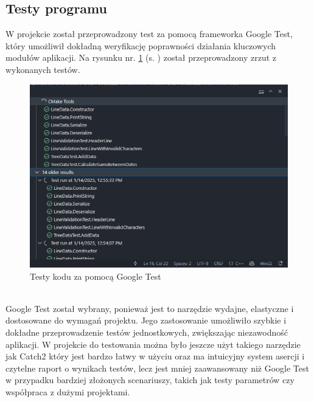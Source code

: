 \subsection{Testy programu}
W projekcie został przeprowadzony test za pomocą frameworka Google Test, który umożliwił dokładną weryfikację poprawności działania kluczowych modułów aplikacji. Na rysunku nr. \ref{rys:rysunek7} (s. \pageref{rys:rysunek7})  został przeprowadzony zrzut z wykonanych testów. 
\\ 
\begin{figure}[h]
    \centering
    \includegraphics[width=0.8\linewidth]{img/test.png}
    \caption{Testy kodu za pomocą Google Test}
    \label{rys:rysunek7}
\end{figure} \\
\noindent Google Test został wybrany, ponieważ jest to narzędzie wydajne, elastyczne i dostosowane do wymagań projektu. Jego zastosowanie umożliwiło szybkie i dokładne przeprowadzenie testów jednostkowych, zwiększając niezawodność aplikacji. W projekcie do testowania można było jeszcze użyt takiego narzędzie jak Catch2 który jest bardzo łatwy w użyciu oraz ma intuicyjny system asercji i czytelne raport o wynikach testów, lecz jest mniej zaawansowany niż Google Test w przypadku bardziej złożonych scenariuszy, takich jak testy parametrów czy współpraca z dużymi projektami.
\newpage
